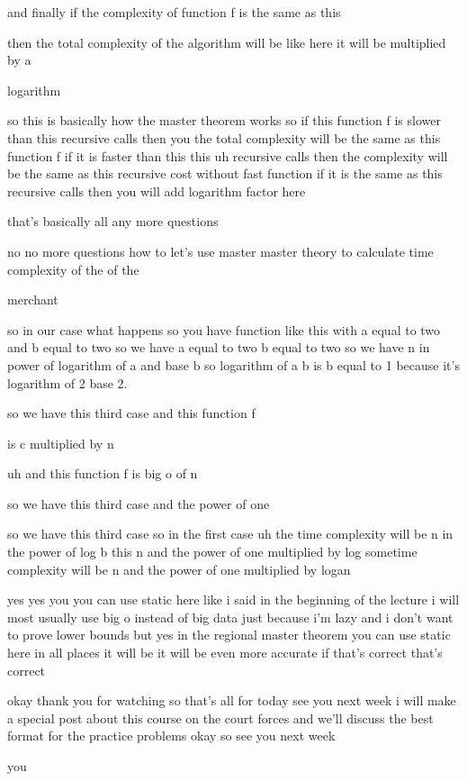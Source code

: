 and finally if the complexity of function f is the same as this

then the total complexity of the algorithm will be like here it will be multiplied by a

logarithm

so this is basically how the master theorem works so if this function f is slower than this recursive calls then you the total complexity will be the same as this function f if it is faster than this this uh recursive calls then the complexity will be the same as this recursive cost without fast function if it is the same as this recursive calls then you will add logarithm factor here

that's basically all any more questions

no no more questions how to let's use master master theory to calculate time complexity of the of the

merchant

so in our case what happens so you have function like this with a equal to two and b equal to two so we have a equal to two b equal to two so we have n in power of logarithm of a and base b so logarithm of a b is b equal to 1 because it's logarithm of 2 base 2.

so we have this third case and this function f

is c multiplied by n

uh and this function f is big o of n

so we have this third case and the power of one

so we have this third case so in the first case uh the time complexity will be n in the power of log b this n and the power of one multiplied by log sometime complexity will be n and the power of one multiplied by logan

yes yes you you can use static here like i said in the beginning of the lecture i will most usually use big o instead of big data just because i'm lazy and i don't want to prove lower bounds but yes in the regional master theorem you can use static here in all places it will be it will be even more accurate if that's correct that's correct

okay thank you for watching so that's all for today see you next week i will make a special post about this course on the court forces and we'll discuss the best format for the practice problems okay so see you next week

you